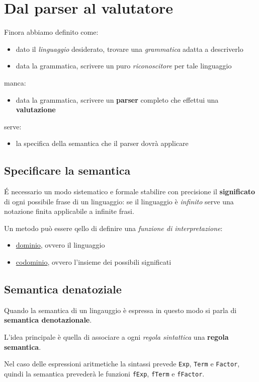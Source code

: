 \section{Dal parser al valutatore}
Finora abbiamo definito come:
\begin{itemize}
    \item dato il \textit{linguaggio} desiderato, trovare una \textit{grammatica} adatta a descriverlo
    \item data la grammatica, scrivere un puro \textit{riconoscitore} per tale linguaggio
\end{itemize}
manca:
\begin{itemize}
    \item data la grammatica, scrivere un \textbf{parser} completo che effettui una \textbf{valutazione}
\end{itemize}
serve:
\begin{itemize}
    \item la specifica della semantica che il parser dovrà applicare
\end{itemize}

\subsection{Specificare la semantica}
É necessario un modo sistematico e formale stabilire con precisione il \textbf{significato} di ogni possibile frase di un linguaggio: se il linguaggio è \textit{infinito} serve una notazione finita applicabile a infinite frasi.

Un metodo può essere qello di definire una \textit{funzione di interpretazione}:
\begin{itemize}
    \item \underline{dominio}, ovvero il linguaggio
    \item \underline{codominio}, ovvero l'insieme dei possibili significati
\end{itemize}

\subsection{Semantica denatoziale}
Quando la semantica di un lingauggio è espressa in questo modo si parla di \textbf{semantica denotazionale}.

L'idea principale è quella di associare a ogni \textit{regola sintattica} una \textbf{regola semantica}.

Nel caso delle espressioni aritmetiche la sintassi prevede \texttt{Exp}, \texttt{Term} e \texttt{Factor}, quindi la semantica prevederà le funzioni \texttt{fExp}, \texttt{fTerm} e \texttt{fFactor}.

